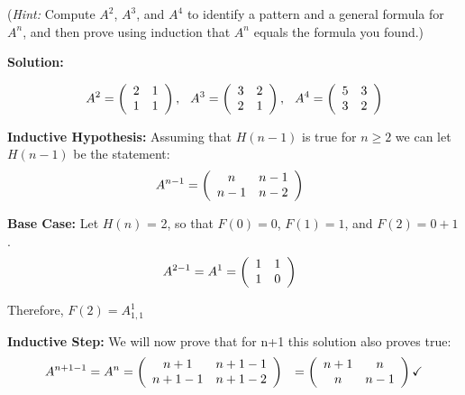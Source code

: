 \documentclass[11pt]{article}
\theoremstyle{definition}
\theoremstyle{theorem}
\begin{document}
({\em Hint:} Compute $A^2$, $A^3$, and $A^4$ to identify a pattern and
a general formula for $A^n$, and then prove using induction that $A^n$
equals the formula you found.)
\begin{flushleft}
\textbf{Solution:}
\end{flushleft}
\begin{center}
\[
A^2 = \left( 
\begin{array}{cc}
2 & 1\\ 
1 & 1
\end{array}
\right),
\hspace{0.25cm}
A^3 = \left( 
\begin{array}{cc}
3 & 2\\ 
2 & 1
\end{array}
\right),
\hspace{0.25cm}
A^4 = \left( 
\begin{array}{cc}
5 & 3\\ 
3 & 2
\end{array}
\right)
\]
\end{center}
\begin{flushleft}
\textbf{Inductive Hypothesis:} Assuming that $H(n-1)$ is true for $n \geq 2$ we can let $H(n-1)$ be the statement: \\
\[
A^{n-1} = \left( 
\begin{array}{cc}
n & n-1\\ 
n-1 & n-2
\end{array}
\right) \hspace{0.25cm}
\] 
\end{flushleft}
\begin{flushleft}
\textbf{Base Case:} Let $H(n)$ = 2, so that $F(0) = 0$,  $F(1) = 1$, and $F(2) = 0 + 1$. 
\[
A^{2-1} = A^1 = \left( 
\begin{array}{cc}
1 & 1\\ 
1 & 0
\end{array}
\right) \hspace{0.25cm}
\] 
\end{flushleft}
\begin{center}
    Therefore, $F(2) = A^{1}_{1,1}$ \checkmark
\end{center}

\begin{flushleft}
\textbf{Inductive Step:} We will now prove that for n+1 this solution also proves true:
\[
A^{n+1-1} = A^n = \left( 
\begin{array}{cc}
n+1 & n+1-1\\ 
n+1-1 & n+1-2
\end{array}
\right) \hspace{0.25cm} = \left( 
\begin{array}{cc}
n+1 & n\\ 
n & n-1
\end{array} \right) \checkmark
\] 
\end{flushleft}
\end{document}
